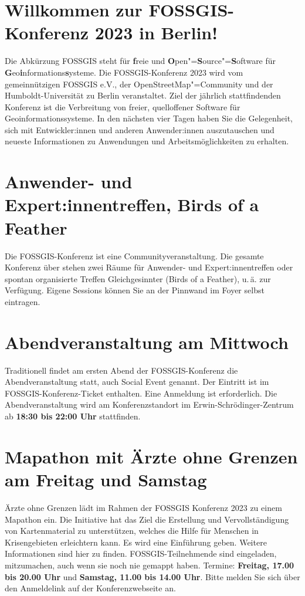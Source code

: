\newpage
\section*{Willkommen zur FOSSGIS-Konferenz 2023 in Berlin!}\label{welcome}
Die Abkürzung { FOSSGIS} steht für {\bfseries f}reie und {\bfseries O}pen"={\bfseries S}ource"={\bfseries S}oftware für {\bfseries G}eo{\bfseries i}nformations{\bfseries s}ysteme.
Die FOSSGIS-Konferenz 2023 wird vom gemeinnützigen FOSSGIS e.V., der
OpenStreetMap"=Community und der Humboldt-Universität zu Berlin
veranstaltet.
Ziel der jährlich stattfindenden Konferenz ist die Verbreitung von freier,
quelloffener Software für Geoinformationssysteme. In den nächsten vier Tagen
haben Sie die Gelegenheit, sich mit Entwickler:innen und anderen Anwender:innen
auszutauschen und \mbox{neueste} Informationen zu Anwendungen und
Arbeitsmöglichkeiten zu erhalten.

\section*{Anwender- und Expert:innentreffen, Birds of a Feather}
Die FOSSGIS-Konferenz ist eine Communityveranstaltung.
Die gesamte Konferenz über stehen zwei Räume für Anwender- und Expert:innentreffen oder spontan organisierte
Treffen Gleichgesinnter (Birds of a Feather), u.\,ä.
zur Verfügung. Eigene Sessions können Sie an der Pinnwand im Foyer selbst eintragen.
\pagebreak

\section*{Abendveranstaltung am Mittwoch}\label{schwaetzli}
Traditionell findet am ersten Abend der FOSSGIS-Konferenz die
Abendveranstaltung statt, auch Social Event genannt. Der Eintritt
ist im FOSSGIS-Konferenz-Ticket enthalten. Eine Anmeldung ist erforderlich.
Die Abendveranstaltung wird am Konferenzstandort im Erwin-Schrödinger-Zentrum
ab {\bfseries 18:30 bis 22:00 Uhr} stattfinden.

\section*{Mapathon mit Ärzte ohne Grenzen am Freitag und Samstag}
Ärzte ohne Grenzen lädt im Rahmen der FOSSGIS Konferenz 2023 zu einem Mapathon ein. Die Initiative hat das Ziel die Erstellung und Vervollständigung von Kartenmaterial zu unterstützen, welches die Hilfe für Menschen in Krisengebieten erleichtern kann. Es wird eine Einführung geben. Weitere Informationen sind hier zu finden. FOSSGIS-Teilnehmende sind eingeladen, mitzumachen, auch wenn sie noch nie gemappt haben.
Termine: {\bfseries Freitag, 17.00 bis 20.00 Uhr} und {\bfseries Samstag, 11.00 bis 14.00 Uhr}. Bitte melden Sie sich über den Anmeldelink auf der Konferenzwebseite an.
\pagebreak

